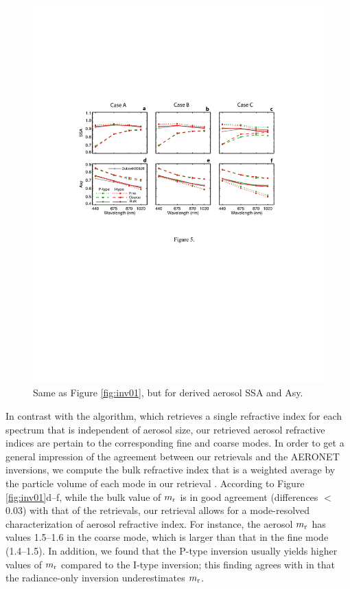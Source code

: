 \begin{figure}[t]
  \centering
  \includegraphics[width={\textwidth}]{figures/inv04.pdf}
  \caption{Same as Figure \ref{fig:inv01}, but for derived aerosol SSA and Asy.}
  \label{fig:inv02}
\end{figure}

In contrast with the \Dub algorithm, which retrieves a single
refractive index for each spectrum that is independent of aerosol size, our
retrieved aerosol refractive indices are pertain to the corresponding fine and
coarse modes. In order to get a general impression of the agreement between our
retrievals and the AERONET inversions, we compute the bulk refractive index
that is a weighted average by the particle volume of each mode in our retrieval
\citep[e.g.,][]{Wang07}. According to Figure \ref{fig:inv01}d--f, while the 
bulk value of $m_\text{r}$ is in good agreement (differences $<$ 0.03) with that of
the \Dub retrievals, our retrieval allows for a mode-resolved characterization
 of aerosol refractive index. For instance, the aerosol $m_\text{r}$ has values 
1.5--1.6 in the coarse mode, which is larger than that in the fine mode (1.4--1.5).
In addition, we found that the P-type inversion usually yields higher values of
$m_\text{r}$ compared to the I-type inversion; this finding agrees with \citet{Li09}
in that the radiance-only inversion underestimates $m_\text{r}$. 

